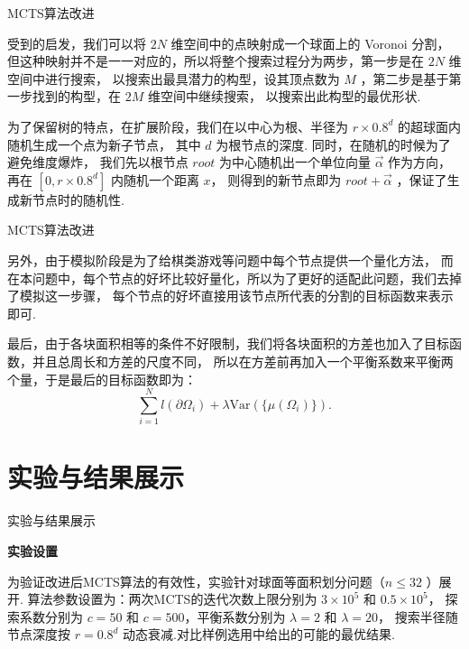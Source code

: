 \documentclass[12pt,aspectratio=169]{beamer}
\begin{document}
\begin{frame}{MCTS算法改进}

  受到\cite{manna2022learning}的启发，我们可以将 $2N$ 维空间中的点映射成一个球面上的 Voronoi 分割，
  但这种映射并不是一一对应的，所以将整个搜索过程分为两步，第一步是在 $2N$ 维空间中进行搜索，
  以搜索出最具潜力的构型，设其顶点数为 $M$ ，第二步是基于第一步找到的构型，在 $2M$ 维空间中继续搜索，
  以搜索出此构型的最优形状. 

  为了保留树的特点，在扩展阶段，我们在以中心为根、半径为 $r\times 0.8^d$ 的超球面内随机生成一个点为新子节点，
  其中 $d$ 为根节点的深度. 同时，在随机的时候为了避免维度爆炸，
  我们先以根节点 $root$ 为中心随机出一个单位向量 $\vec\alpha$ 作为方向，
  再在 $[0,r\times 0.8^d]$ 内随机一个距离 $x$，
  则得到的新节点即为 $root+\vec\alpha$ ，保证了生成新节点时的随机性. 

\end{frame}

\begin{frame}{MCTS算法改进}

  另外，由于模拟阶段是为了给棋类游戏等问题中每个节点提供一个量化方法，
  而在本问题中，每个节点的好坏比较好量化，所以为了更好的适配此问题，我们去掉了模拟这一步骤，
  每个节点的好坏直接用该节点所代表的分割的目标函数来表示即可. 

  最后，由于各块面积相等的条件不好限制，我们将各块面积的方差也加入了目标函数，并且总周长和方差的尺度不同，
  所以在方差前再加入一个平衡系数来平衡两个量，于是最后的目标函数即为：
  $$\sum_{i=1}^Nl(\partial\Omega_i)+\lambda\mathrm{Var}(\{\mu(\Omega_i)\}).$$

\end{frame}

\section{实验与结果展示}

\begin{frame}{实验与结果展示}

  \textbf{实验设置}

  为验证改进后MCTS算法的有效性，实验针对球面等面积划分问题（$n\leq 32$ ）展开.
  算法参数设置为：两次MCTS的迭代次数上限分别为 $3\times 10^5$ 和 $0.5\times 10^5$，
  探索系数分别为 $c=50$ 和 $c=500$，平衡系数分别为 $\lambda=2$ 和 $\lambda=20$，
  搜索半径随节点深度按 $r=0.8^d$ 动态衰减.对比样例选用\cite{cox2010minimal}中给出的可能的最优结果. 

\end{frame}
\end{document}
